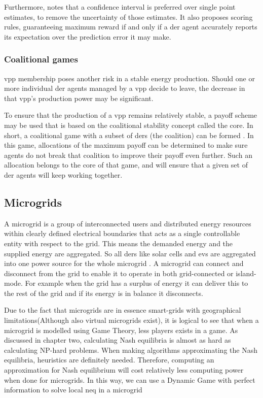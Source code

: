 Furthermore, \cite{RobuKotaChalkiadakisEtAl2012} notes that a confidence interval is preferred over single point estimates, to remove the uncertainty of those estimates. It also proposes scoring rules, guaranteeing maximum reward if and only if a \ac{der} agent accurately reports its expectation over the prediction error it may make.  

\subsubsection{Coalitional games}
\label{vpp:coalition}
\ac{vpp} membership poses another risk in a stable energy production. Should one or more individual \ac{der} agents managed by a \ac{vpp} decide to leave, the decrease in that \ac{vpp}'s production power may be significant. 

To ensure that the production of a \ac{vpp} remains relatively stable, a payoff scheme may be used that is based on the coalitional stability concept called the core. In short, a coalitional game with a subset of \acp{der} (the coalition) can be formed \cite{MihailescuVasiraniOssowski2011}. In this game, allocations of the maximum payoff can be determined to make sure agents do not break that coalition to improve their payoff even further\cite{ChalkiadakisRobuKotaEtAl2011, YeungPoonWu1999, SaadHanPoor2011}. Such an allocation belongs to the core of that game, and will ensure that a given set of \ac{der} agents will keep working together.

\subsection{Microgrids}
A microgrid is a group of interconnected users and distributed energy resources within clearly defined electrical boundaries that acts as a single controllable entity with respect to the grid. This means the demanded energy and the supplied energy are aggregated. So all \acp{der} like solar cells and \acp{ev} are aggregated into one power source for the whole microgrid \cite{KanchevLuColasEtAl2011}. A microgrid can connect and disconnect from the grid to enable it to operate in both grid-connected or island-mode. For example when the grid has a surplus of energy it can deliver this to the rest of the grid and if its energy is in balance it disconnects. 

Due to the fact that microgrids are in essence smart-grids with geographical limitations(Although also virtual microgrids exist), it is logical to see that when a microgrid is modelled using Game Theory, less players exists in a game. As discussed in chapter two, calculating Nash equilibria is almost as hard as calculating NP-hard problems. When making algorithms approximating the Nash equilibria, heuristics are definitely needed. Therefore, computing an approximation for Nash equilibrium will cost relatively less computing power when done for microgrids. In this way, we can use a Dynamic Game with perfect information to solve local \ac{neq} in a microgrid

